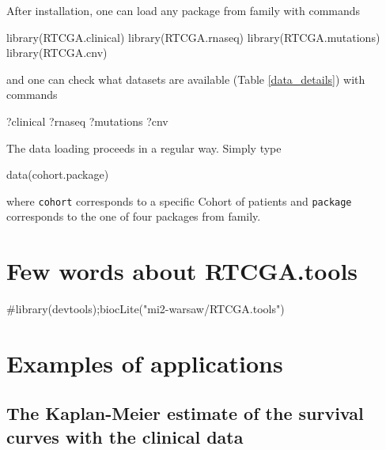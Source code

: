 After installation, one can load any package from 
family with commands

\begin{Schunk}
\begin{Sinput}
library(RTCGA.clinical)
library(RTCGA.rnaseq)
library(RTCGA.mutations)
library(RTCGA.cnv)
\end{Sinput}
\end{Schunk}

and one can check what datasets are available (Table \ref{data_details})
with commands

\begin{Schunk}
\begin{Sinput}
?clinical
?rnaseq
?mutations
?cnv
\end{Sinput}
\end{Schunk}

The data loading proceeds in a regular way. Simply type

\begin{Schunk}
\begin{Sinput}
data(cohort.package)
\end{Sinput}
\end{Schunk}

where \texttt{cohort} corresponds to a specific Cohort of patients and
\texttt{package} corresponds to the one of four packages from
 family.

\section{Few words about RTCGA.tools}\label{few-words-about-rtcga.tools}

\begin{Schunk}
\begin{Sinput}
#library(devtools);biocLite("mi2-warsaw/RTCGA.tools") 
\end{Sinput}
\end{Schunk}

\newpage

\section{Examples of applications}\label{examples-of-applications}

\subsection{The Kaplan-Meier estimate of the survival curves with the
clinical
data}\label{the-kaplan-meier-estimate-of-the-survival-curves-with-the-clinical-data}

